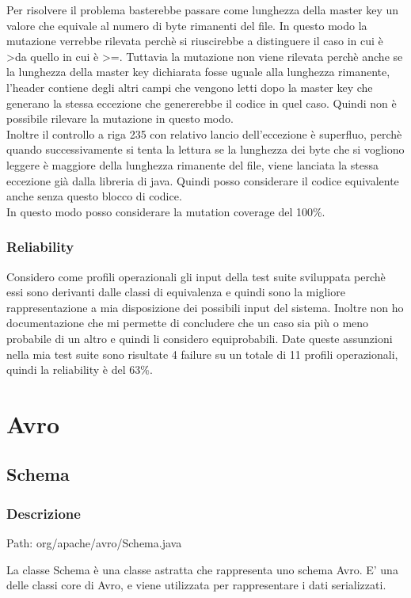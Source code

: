 \documentclass[12pt, a4paper]{article}
\begin{document}
Per risolvere il problema basterebbe passare come lunghezza della master key un valore che equivale al numero di byte rimanenti
del file. In questo modo la mutazione verrebbe rilevata perchè si riuscirebbe a distinguere il caso in cui è \textgreater da quello in cui
è \textgreater=. Tuttavia la mutazione non viene rilevata perchè anche se la lunghezza della master key dichiarata fosse uguale alla
lunghezza rimanente, l'header contiene degli altri campi che vengono letti dopo la master key che generano la stessa eccezione 
che genererebbe il codice in quel caso. Quindi non è possibile rilevare la mutazione in questo modo. \\
Inoltre il controllo a riga 235 con relativo lancio dell'eccezione è superfluo, perchè quando successivamente si tenta la lettura
se la lunghezza dei byte che si vogliono leggere è maggiore della lunghezza rimanente del file, viene lanciata la stessa eccezione
già dalla libreria di java. Quindi posso considerare il codice equivalente anche senza questo blocco di codice. \\
In questo modo posso considerare la mutation coverage del 100\%.

\subsubsection{Reliability}
Considero come profili operazionali gli input della test suite sviluppata perchè essi sono derivanti dalle classi di equivalenza
e quindi sono la migliore rappresentazione a mia disposizione dei possibili input del sistema. Inoltre non ho documentazione che
mi permette di concludere che un caso sia più o meno probabile di un altro e quindi li considero equiprobabili. Date queste 
assunzioni nella mia test suite sono risultate 4 failure su un totale di 11 profili operazionali, quindi la reliability è del 63\%.

\newpage
\section{Avro}
\subsection{Schema}
\subsubsection{Descrizione}
Path: org/apache/avro/Schema.java

La classe Schema è una classe astratta che rappresenta uno schema Avro. E' una delle classi core di Avro, e viene utilizzata
per rappresentare i dati serializzati. \\
\end{document}

